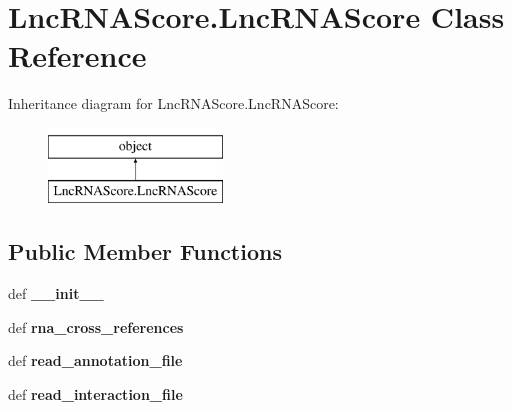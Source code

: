 \hypertarget{classLncRNAScore_1_1LncRNAScore}{\section{Lnc\-R\-N\-A\-Score.\-Lnc\-R\-N\-A\-Score Class Reference}
\label{classLncRNAScore_1_1LncRNAScore}
}
Inheritance diagram for Lnc\-R\-N\-A\-Score.\-Lnc\-R\-N\-A\-Score\-:\begin{figure}[H]
\begin{center}
\leavevmode
\includegraphics[height=2.000000cm]{classLncRNAScore_1_1LncRNAScore}
\end{center}
\end{figure}
\subsection*{Public Member Functions}
\begin{DoxyCompactItemize}
\item 
\hypertarget{classLncRNAScore_1_1LncRNAScore_a18cc7ab3e946f047a3646d8e23f1c61e}{def {\bfseries \-\_\-\-\_\-init\-\_\-\-\_\-}}\label{classLncRNAScore_1_1LncRNAScore_a18cc7ab3e946f047a3646d8e23f1c61e}

\item 
\hypertarget{classLncRNAScore_1_1LncRNAScore_aae9bee080459aee4bbd149f52612b4bb}{def {\bfseries rna\-\_\-cross\-\_\-references}}\label{classLncRNAScore_1_1LncRNAScore_aae9bee080459aee4bbd149f52612b4bb}

\item 
\hypertarget{classLncRNAScore_1_1LncRNAScore_a244e3672ae4c7333a27508086158ac82}{def {\bfseries read\-\_\-annotation\-\_\-file}}\label{classLncRNAScore_1_1LncRNAScore_a244e3672ae4c7333a27508086158ac82}

\item 
\hypertarget{classLncRNAScore_1_1LncRNAScore_a99bebe98d4bf1ac2b23ff0edcaaaf7e4}{def {\bfseries read\-\_\-interaction\-\_\-file}}\label{classLncRNAScore_1_1LncRNAScore_a99bebe98d4bf1ac2b23ff0edcaaaf7e4}

\end{DoxyCompactItemize}
